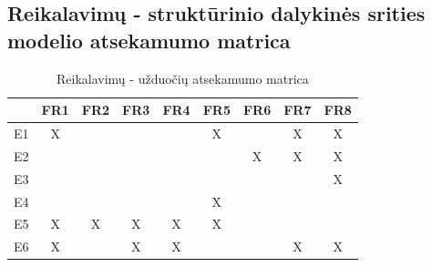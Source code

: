 \documentclass{VUMIFPSkursinis}
\begin{document}
            \subsection{Reikalavimų - struktūrinio dalykinės srities modelio atsekamumo matrica}
            \begin{table}[H]\footnotesize
                \centering
                \caption{Reikalavimų - užduočių atsekamumo matrica}
                {
                    \begin{tabular}{|c|c|c|c|c|c|c|c|c| }
                    \hline
                        & FR1 & FR2 & FR3 & FR4 & FR5 & FR6 & FR7 & FR8 \\ 
                    \hline
                        E1 & X   &     &     &     & X   &     & X   & X    \\  
                    \hline
                        E2 &     &     &     &     &     & X   & X   & X    \\ 
                    \hline
                        E3 &     &     &     &     &     &     &     & X    \\ 
                    \hline
                        E4 &     &     &     &     & X   &     &     &      \\ 
                    \hline
                        E5 & X   & X   & X   & X   & X   &     &     &      \\ 
                    \hline
                        E6 & X   &     & X   & X   &     &     & X   & X    \\ 
                    \hline 
                    \end{tabular}
                }
            \end{table}
      
\end{document}
